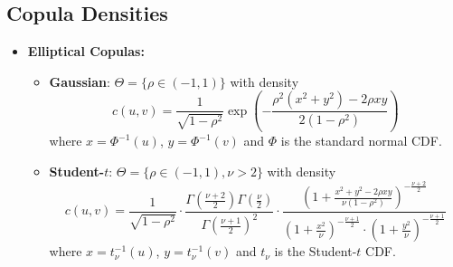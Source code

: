 
\subsection{Copula Densities}\label{subsec:copula_densities}
\begin{itemize}
\item \textbf{Elliptical Copulas:}
   \begin{itemize}
   \item \textbf{Gaussian}: $\Theta = \{\rho \in (-1,1)\}$ with density
$$\displaystyle
c(u, v) = \frac{1}{\sqrt{1-\rho^2}} \exp\left(-\frac{\rho^2(x^2 + y^2) - 2\rho xy}{2(1-\rho^2)}\right)
$$
   where $x = \Phi^{-1}(u)$, $y = \Phi^{-1}(v)$ and $\Phi$ is the standard normal CDF.
   
   \item \textbf{Student-$t$}: $\Theta = \{\rho \in (-1,1), \nu > 2\}$ with density
$$\displaystyle
c(u,v) = \frac{1}{\sqrt{1-\rho^2}} \cdot \frac{\Gamma(\frac{\nu+2}{2})\Gamma(\frac{\nu}{2})}{\Gamma(\frac{\nu+1}{2})^2} \cdot \frac{\left(1 + \frac{x^2 + y^2 - 2\rho xy}{\nu(1-\rho^2)}\right)^{-\frac{\nu+2}{2}}}{\left(1 + \frac{x^2}{\nu}\right)^{-\frac{\nu+1}{2}} \cdot \left(1 + \frac{y^2}{\nu}\right)^{-\frac{\nu+1}{2}}}
$$
where $x = t_\nu^{-1}(u)$, $y = t_\nu^{-1}(v)$ and $t_\nu$ is the Student-$t$ CDF.
   \end{itemize}	


\end{itemize}
